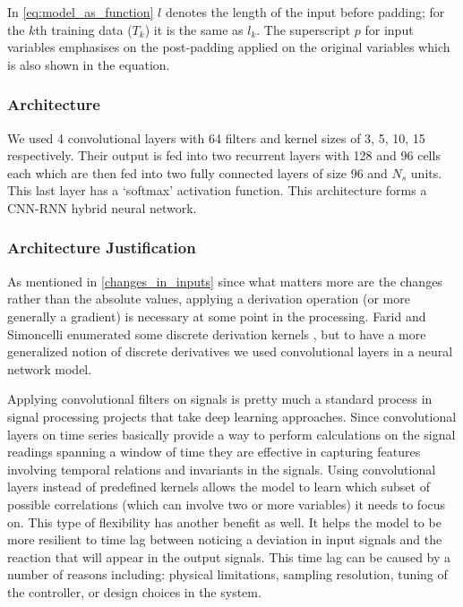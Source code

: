 In \eqref{eq:model_as_function} $l$ denotes the length of the input before padding; for the $k$th training data ($T_k$) it is the same as $l_k$. The superscript $p$ for input variables emphasises on the post-padding applied on the original variables which is also shown in the equation.

\subsubsection{Architecture}


We used 4 convolutional layers with 64 filters and kernel sizes of 3, 5, 10, 15 respectively.
Their output is fed into two recurrent layers with 128 and 96 cells each which are then fed into two fully connected layers of size 96 and $N_s$ units. This last layer has a `softmax' activation function.
This architecture forms a CNN-RNN hybrid neural network. \cite{Wang2017}


\subsubsection{Architecture Justification}
As mentioned in \ref{changes_in_inputs} since what matters more are the changes rather than the absolute values, applying a derivation operation (or more generally a gradient) is necessary at some point in the processing. 
Farid and Simoncelli enumerated some discrete derivation kernels \cite{Farid2004}, but to have a more generalized notion of discrete derivatives we used convolutional layers in a neural network model. 

Applying convolutional filters on signals is pretty much a standard process in signal processing projects that take deep learning approaches.  \cite{morales2016deep, zeng2014convolutional, yang2015deep} Since convolutional layers on time series basically provide a way to perform calculations on the signal readings spanning a window of time they are effective in capturing features involving temporal relations and invariants in the signals. \cite{wang2017time} 
Using convolutional layers instead of predefined kernels allows the model to learn which subset of possible correlations (which can involve two or more variables) it needs to focus on. This type of flexibility has another benefit as well. It helps the model to be more resilient to time lag between noticing a deviation in input signals and the reaction that will appear in the output signals. This time lag can be caused by a number of reasons including: physical limitations, sampling resolution, tuning of the controller, or design choices in the system.

